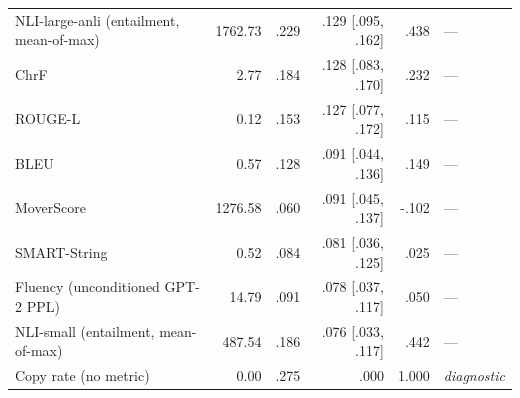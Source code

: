 \begin{table}[t]
\begin{tabular}{@{}lrrrrl@{}}
NLI-large-anli (entailment, mean-of-max) & 1762.73 & .229 & .129 {\scriptsize [.095, .162]} & .438 & --- \\
ChrF & 2.77 & .184 & .128 {\scriptsize [.083, .170]} & .232 & --- \\
ROUGE-L & 0.12 & .153 & .127 {\scriptsize [.077, .172]} & .115 & --- \\
BLEU & 0.57 & .128 & .091 {\scriptsize [.044, .136]} & .149 & --- \\
MoverScore & 1276.58 & .060 & .091 {\scriptsize [.045, .137]} & -.102 & --- \\
SMART-String & 0.52 & .084 & .081 {\scriptsize [.036, .125]} & .025 & --- \\
Fluency (unconditioned GPT-2 PPL) & 14.79 & .091 & .078 {\scriptsize [.037, .117]} & .050 & --- \\
NLI-small (entailment, mean-of-max) & 487.54 & .186 & .076 {\scriptsize [.033, .117]} & .442 & --- \\
\midrule
Copy rate (no metric) & 0.00 & .275 & .000 & 1.000 & \emph{diagnostic} \\
\bottomrule
\end{tabular}
\end{table}
